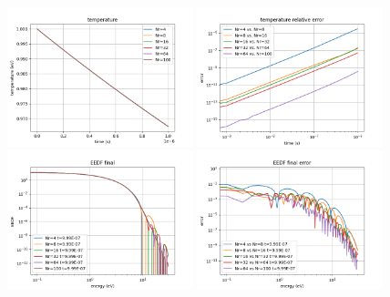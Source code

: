 \documentclass[mathserif, aspectratio=169]{beamer}
\begin{document}
\begin{frame}
\begin{figure}
			\only<+>
			{
				\includegraphics[width=0.48\textwidth]{g0_mw_smoothed_temp.png}
				\includegraphics[width=0.48\textwidth]{g0_mw_smoothed_temp_error.png}
			}
			\only<+>
			{
				\includegraphics[width=0.48\textwidth]{g0_mw_smoothed_eedf_final.png}
				\includegraphics[width=0.48\textwidth]{g0_mw_smoothed_eedf_final_error.png}
			}
		\end{figure}
	\end{frame}
\end{document}
